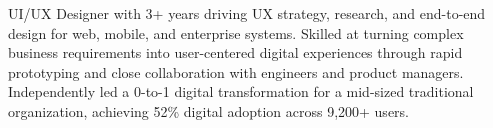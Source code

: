 \vspace{-2.0mm}
{\fontsize{9pt}{1.2em}\bodyfont\upshape\color{graytext}
UI/UX Designer with 3+ years driving UX strategy, research, and end-to-end design for web, mobile, and enterprise systems. Skilled at turning complex business requirements into user-centered digital experiences through rapid prototyping and close collaboration with engineers and product managers. Independently led a 0-to-1 digital transformation for a mid-sized traditional organization, achieving 52\% digital adoption across 9,200+ users.}

\vspace{0.5mm}
